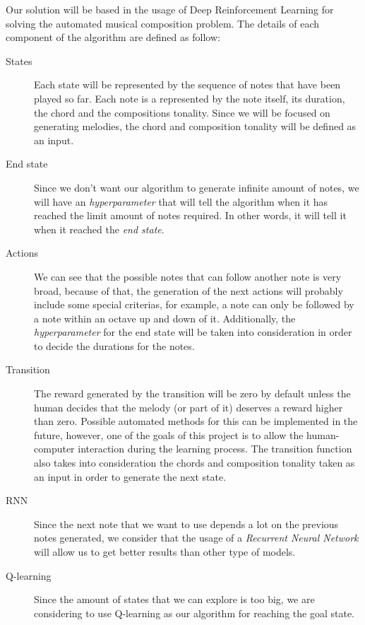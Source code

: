 Our solution will be based in the usage of Deep Reinforcement Learning for solving the automated musical composition problem. The details of each component of the algorithm are defined as follow:

\begin{description}
  \item [States] Each state will be represented by the sequence of notes that have been played so far. Each note is a represented by the note itself, its duration, the chord and the compositions tonality. Since we will be focused on generating melodies, the chord and composition tonality will be defined as an input.
  \item [End state] Since we don't want our algorithm to generate infinite amount of notes, we will have an \emph{hyperparameter} that will tell the algorithm when it has reached the limit amount of notes required. In other words, it will tell it when it reached the \emph{end state}.
  \item [Actions] We can see that the possible notes that can follow another note is very broad, because of that, the generation of the next actions will probably include some special criterias, for example, a note can only be followed by a note within an octave up and down of it. Additionally, the \emph{hyperparameter} for the end state will be taken into consideration in order to decide the durations for the notes.
  \item [Transition] The reward generated by the transition will be zero by default unless the human decides that the melody (or part of it) deserves a reward higher than zero. Possible automated methods for this can be implemented in the future, however, one of the goals of this project is to allow the human-computer interaction during the learning process. The transition function also takes into consideration the chords and composition tonality taken as an input in order to generate the next state.
  \item [RNN] Since the next note that we want to use depends a lot on the previous notes generated, we consider that the usage of a \emph{Recurrent Neural Network} will allow us to get better results than other type of models.
  \item [Q-learning] Since the amount of states that we can explore is too big, we are considering to use Q-learning as our algorithm for reaching the goal state.
\end{description}

